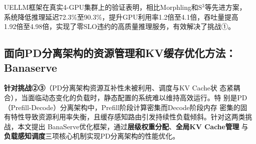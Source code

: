 UELLM框架在真实4-GPU集群上的验证表明，相比Morphling和S$^3$等先进方案，
系统降低推理延迟72.3\%至90.3\%，提升GPU利用率1.2倍至4.1倍，吞吐量提高
1.92倍至4.98倍，实现了零SLO违约的高质量推理服务，有效解决了挑战①。

\subsection{面向PD分离架构的资源管理和KV缓存优化方法：Banaserve}
\label{sec:banaserve}

\textbf{针对挑战②③}（PD分离架构资源互补性未被利用、调度与KV Cache状
态紧耦合），当面临动态变化的负载时，静态配置的系统难以维持高效运行。特
别是PD（Prefill-Decode）分离架构中，Prefill阶段计算密集而Decode阶段内存
密集的固有特性导致资源利用率失衡\cite{ruan2025dynaserve,zhou2024survey,
blitzscale}，且缓存感知路由引发持续性负载倾斜。针对这两类挑战，本文提出
BanaServe优化框架，通过\textbf{层级权重分配}、\textbf{全局KV Cache管理}
与\textbf{负载感知调度}三项核心机制实现PD分离架构的性能优化。

